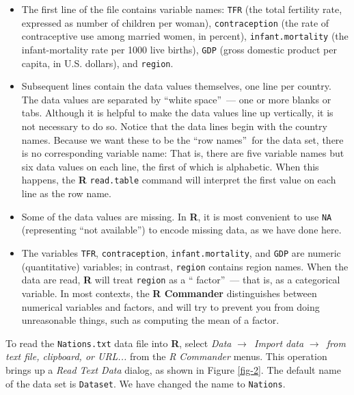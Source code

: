 \documentclass{article}%
\begin{document}
\begin{itemize}
\item The first line of the file contains variable names: \texttt{TFR} (the
total fertility rate, expressed as number of children per woman),
\texttt{contraception} (the rate of contraceptive use among married women, in
percent), \texttt{infant.mortality} (the infant-mortality rate per 1000 live
births), \texttt{GDP} (gross domestic product per capita, in U.S. dollars),
and \texttt{region}.

\item Subsequent lines contain the data values themselves, one line per
country. The data values are separated by \textquotedblleft white
space\textquotedblright\ --- one or more blanks or tabs. Although it is
helpful to make the data values line up vertically, it is not necessary to do
so. Notice that the data lines begin with the country names. Because we want
these to be the \textquotedblleft row names\textquotedblright\ for the data
set, there is no corresponding variable name: That is, there are five variable
names but six data values on each line, the first of which is alphabetic. When
this happens, the \textbf{R} \texttt{read.table} command will interpret the
first value on each line as the row name.

\item Some of the data values are missing. In \textbf{R}, it is most
convenient to use \texttt{NA} (representing \textquotedblleft not
available\textquotedblright) to encode missing data, as we have done here.

\item The variables \texttt{TFR}, \texttt{contraception},
\texttt{infant.mortality}, and \texttt{GDP} are numeric (quantitative)
variables; in contrast, \texttt{region} contains region names. When the data
are read, \textbf{R} will treat \texttt{region} as a \textquotedblleft
factor\textquotedblright\ --- that is, as a categorical variable. In most
contexts, the \textbf{R Commander} distinguishes between numerical variables
and factors, and will try to prevent you from doing unreasonable things, such
as computing the mean of a factor.
\end{itemize}

To read the \texttt{Nations.txt} data file into \textbf{R}, select \emph{Data
}$\longrightarrow$\emph{\ Import data }$\longrightarrow$\emph{\ from text
file, clipboard, or URL...} from the \emph{R Commander} menus. This operation
brings up a \emph{Read Text Data} dialog, as shown in Figure \ref{fig-2}. The
default name of the data set is \texttt{Dataset}. We have changed the name to
\texttt{Nations}.
\end{document}
